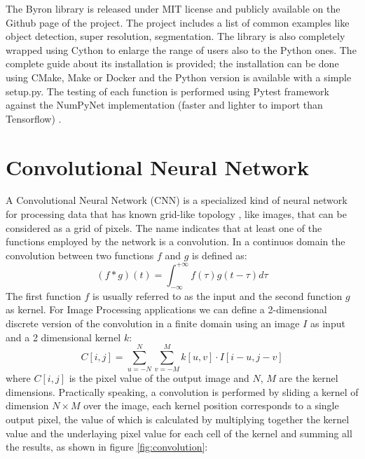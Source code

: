 \documentclass[12pt,a4paper]{report}
\begin{document}
The \textsf{Byron} library is released under \textsf{MIT} license and publicly available on the \textsf{Github} page of the project.
The project includes a list of common examples like object detection, super resolution, segmentation.
The library is also completely wrapped using \textsf{Cython} to enlarge the range of users also to the \textsf{Python} ones.
The complete guide about its installation is provided; the installation can be done using \textsf{CMake}, \textsf{Make} or \textsf{Docker} and the \textsf{Python} version is available with a simple \textsf{setup.py}.
The testing of each function is performed using \textsf{Pytest} framework against the \textsf{NumPyNet} implementation (faster and lighter to import than \textsf{Tensorflow}) \cite{nicotesi}.

\section{Convolutional Neural Network}

A Convolutional Neural Network (CNN) is a specialized kind of neural network for processing data that has known grid-like topology \cite{Goodfellow-et-al-2016}, like images, that can be considered as a grid of pixels.
The name indicates that at least one of the functions employed by the network is a convolution. In a continuos domain the convolution between two functions $f$ and $g$ is defined as: 
\begin{equation}
 (f * g)(t) = \int_{-\infty}^{+\infty} f(\tau)g(t-\tau)d\tau
\end{equation}
The first function $f$ is usually referred to as the input and the second function $g$ as kernel. 
For Image Processing applications we can define a 2-dimensional discrete version of the convolution in a finite domain using an image $I$ as input and a 2 dimensional kernel $k$:
\begin{equation}
 C[i, j] = \sum_{u=-N}^N \sum_{v=-M}^M k[u, v] \cdot I[i-u, j-v]
 \label{eq:conv}
\end{equation}
where $C[i, j]$ is the pixel value of the output image and $N$, $M$ are the kernel dimensions.
Practically speaking, a convolution is performed by sliding a kernel of dimension $N \times M$ over the image, each kernel position corresponds to a single output pixel, the value of which is calculated by multiplying together the kernel value and the underlaying pixel value for each cell of the kernel and summing all the results, as shown in figure \ref{fig:convolution}:
\end{document}
